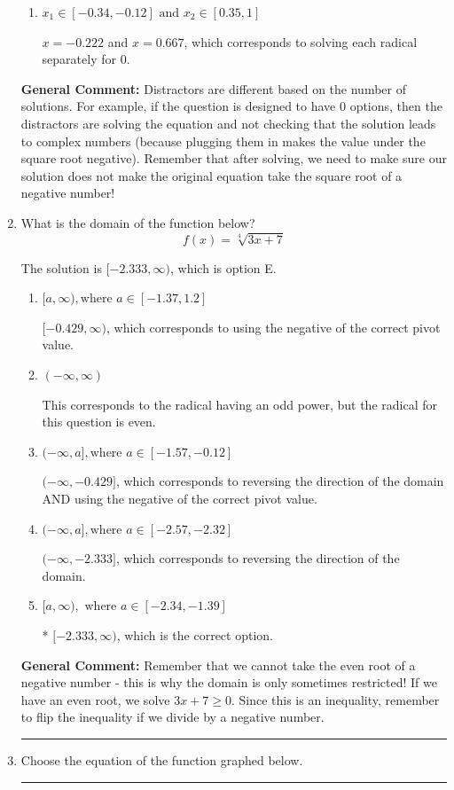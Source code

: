 \documentclass{extbook}[14pt]
\newcommand{\litem}[1]{\item #1

\rule{\textwidth}{0.4pt}}
\begin{document}
\begin{enumerate}
{\begin{enumerate}[label=\Alph*.]
This corresponds to not checking that the potential solution $x = 0.222$ leads to a complex value in the original equation.
\item \( x_1 \in [-0.34, -0.12] \text{ and } x_2 \in [0.35,1] \)

$x = -0.222$ and $x = 0.667$, which corresponds to solving each radical separately for 0.
\end{enumerate}

\textbf{General Comment:} Distractors are different based on the number of solutions. For example, if the question is designed to have 0 options, then the distractors are solving the equation and not checking that the solution leads to complex numbers (because plugging them in makes the value under the square root negative). Remember that after solving, we need to make sure our solution does not make the original equation take the square root of a negative number!
}
\litem{
What is the domain of the function below?
\[ f(x) = \sqrt[4]{3 x + 7} \]

The solution is \( [-2.333, \infty) \), which is option E.\begin{enumerate}[label=\Alph*.]
\item \( [a, \infty), \text{where } a \in [-1.37, 1.2] \)

$[-0.429, \infty)$, which corresponds to using the negative of the correct pivot value.
\item \( (-\infty, \infty) \)

This corresponds to the radical having an odd power, but the radical for this question is even.
\item \( (-\infty, a], \text{where } a \in [-1.57, -0.12] \)

$(-\infty, -0.429]$, which corresponds to reversing the direction of the domain AND using the negative of the correct pivot value.
\item \( (-\infty, a], \text{where } a \in [-2.57, -2.32] \)

 $(-\infty, -2.333]$, which corresponds to reversing the direction of the domain.
\item \( [a, \infty), \text{ where } a \in [-2.34, -1.39] \)

* $[-2.333, \infty)$, which is the correct option.
\end{enumerate}

\textbf{General Comment:} Remember that we cannot take the even root of a negative number - this is why the domain is only sometimes restricted! If we have an even root, we solve $3 x + 7 \geq 0$. Since this is an inequality, remember to flip the inequality if we divide by a negative number.
}
\litem{
Choose the equation of the function graphed below.

}
\end{enumerate}
\end{document}
